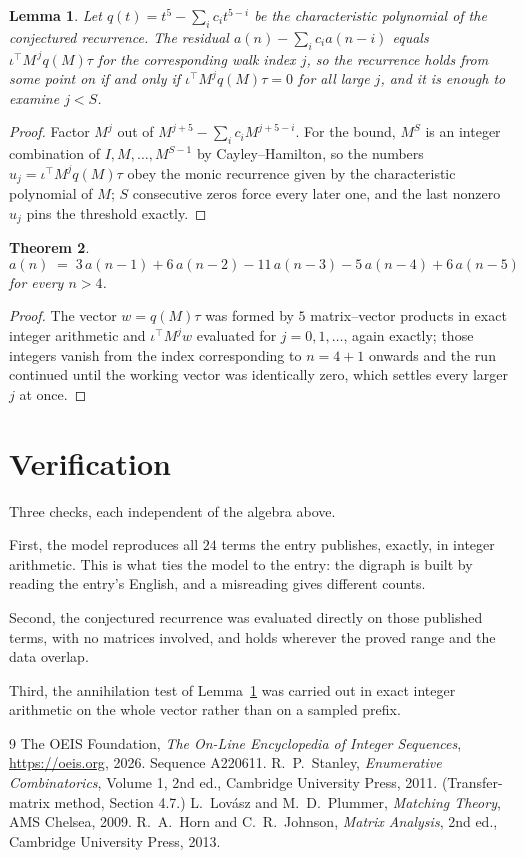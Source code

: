 \documentclass[11pt,a4paper]{article}
\theoremstyle{plain}
\newtheorem{theorem}{Theorem}
\newtheorem{lemma}[theorem]{Lemma}
\theoremstyle{definition}
\begin{document}
\begin{lemma}\label{lem:crit}
Let $q(t)=t^{5}-\sum_i c_it^{5-i}$ be the characteristic polynomial of the
conjectured recurrence. The residual $a(n)-\sum_ic_ia(n-i)$ equals
$\iota^{\!\top}M^{\,j}q(M)\tau$ for the corresponding walk index $j$, so the recurrence
holds from some point on if and only if $\iota^{\!\top}M^{j}q(M)\tau=0$ for all large $j$,
and it is enough to examine $j<S$.
\end{lemma}

\begin{proof}
Factor $M^{j}$ out of $M^{j+5}-\sum_ic_iM^{j+5-i}$. For the bound, $M^{S}$
is an integer combination of $I,M,\dots,M^{S-1}$ by Cayley--Hamilton, so the numbers
$u_j=\iota^{\!\top}M^{j}q(M)\tau$ obey the monic recurrence given by the characteristic
polynomial of $M$; $S$ consecutive zeros force every later one, and the last nonzero $u_j$
pins the threshold exactly.
\end{proof}

\begin{theorem}
\[
a(n)\;=\;3\,a(n-1) + 6\,a(n-2) - 11\,a(n-3) - 5\,a(n-4) + 6\,a(n-5)
\]
for every $n>4$.
\end{theorem}

\begin{proof}
The vector $w=q(M)\tau$ was formed by $5$ matrix--vector products in exact integer
arithmetic and $\iota^{\!\top}M^{j}w$ evaluated for $j=0,1,\dots$, again exactly; those
integers vanish from the index corresponding to $n=4+1$ onwards and the run continued
until the working vector was identically zero, which settles every larger $j$ at once.
\end{proof}

\section{Verification}

Three checks, each independent of the algebra above.

First, the model reproduces all $24$ terms the entry publishes, exactly, in integer
arithmetic. This is what ties the model to the entry: the digraph is built by reading the
entry's English, and a misreading gives different counts.

Second, the conjectured recurrence was evaluated directly on those published terms, with no
matrices involved, and holds wherever the proved range and the data overlap.

Third, the annihilation test of Lemma~\ref{lem:crit} was carried out in exact integer
arithmetic on the whole vector rather than on a sampled prefix.

\begin{thebibliography}{9}
 The OEIS Foundation, \emph{The On-Line Encyclopedia of Integer
Sequences}, \url{https://oeis.org}, 2026. Sequence A220611.
 R.~P.~Stanley, \emph{Enumerative Combinatorics}, Volume 1, 2nd ed.,
Cambridge University Press, 2011. (Transfer-matrix method, Section 4.7.)
 L.~Lov\'asz and M.~D.~Plummer, \emph{Matching Theory}, AMS Chelsea,
2009.
 R.~A.~Horn and C.~R.~Johnson, \emph{Matrix Analysis}, 2nd ed., Cambridge
University Press, 2013.
\end{thebibliography}
\end{document}
